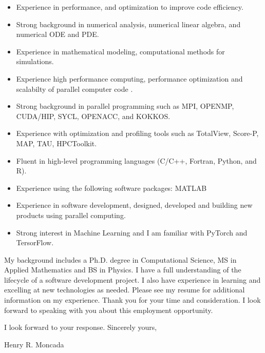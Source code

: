 \documentclass[10pt]{article}
\begin{document}
\begin{itemize}
\item Experience in performance, and optimization to improve code efficiency.
\item Strong background in numerical analysis, numerical linear algebra, and numerical ODE and PDE.
\item Experience in mathematical modeling, computational methods for simulations.
\item Experience high performance computing, performance optimization and scalabilty of parallel computer code .
\item Strong background in parallel programming such as MPI, OPENMP, CUDA/HIP, SYCL, OPENACC, and KOKKOS.
\item Experience with optimization and profiling tools such as TotalView, Score-P, MAP, TAU, HPCToolkit. 
\item Fluent in high-level programming languages (C/C++, Fortran, Python, and R).
\item Experience using the following software packages: MATLAB 
\item Experience in software development, designed, developed and building new products using parallel computing.
\item Strong interest in Machine Learning and I am  familiar with PyTorch and TersorFlow.
\end{itemize}
My background includes a Ph.D. degree in Computational Science, MS in Applied Mathematics and BS in Physics. 
I have a full understanding of the lifecycle of a software development project. I also have experience in learning and excelling at new technologies as needed.
Please see my resume for additional information on my experience. Thank you for your time and consideration. I look forward to speaking with you about this employment opportunity.

I look forward to your response.
\bigskip %
Sincerely yours,
\bigskip %

Henry R. Moncada
\end{document}
